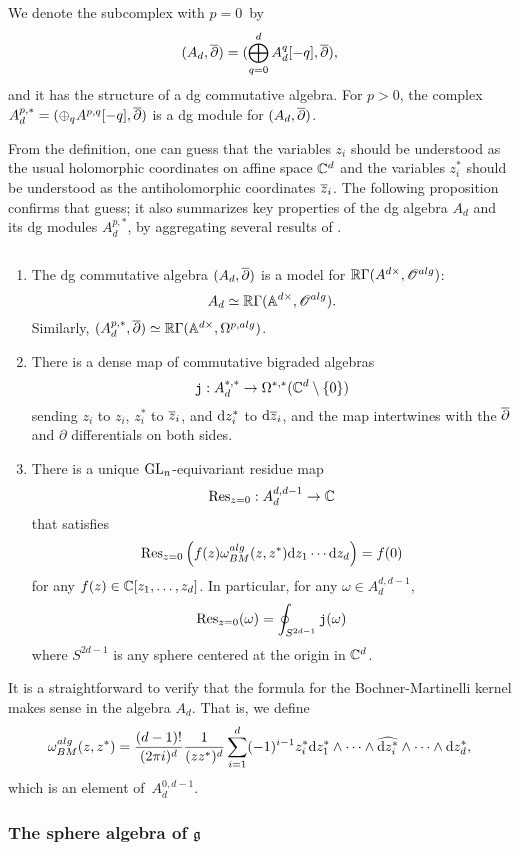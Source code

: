 We denote the subcomplex with $p=0$~by 
\[
(A_d, \dbar) = (\bigoplus_{q = 0}^d A_d^{q}[-q], \dbar),
\] 
and it has the structure of a dg commutative algebra.
For $p>0$, the complex $A^{p,*}_d = (\oplus_q A^{p,q}[-q], \dbar)$ is a dg module for $(A_d, \dbar)$.

From the definition, one can guess that the variables $z_i$ should be understood as the usual holomorphic coordinates on affine space $\CC^d$ and the variables $z^*_i$ should be understood as the antiholomorphic coordinates $\zbar_i$.
The following proposition confirms that guess;
it also summarizes key properties of the dg algebra $A_d$ and its dg modules $A_{d}^{p,*}$,
by aggregating several results of \cite{FHK}.

\begin{prop}
\label{prop: Ad} $\;$
\begin{enumerate}
\item
The dg commutative algebra $(A_d,\dbar)$ is a model for $\RR \Gamma(A^{d\times}, \sO^{alg})$:
\[
A_d \simeq \RR\Gamma(\AA^{d \times}, \sO^{alg}) .
\]
Similarly, $(A_d^{p,*},\dbar) \simeq \RR \Gamma(\AA^{d\times}, \Omega^{p,alg})$.
\item There is a dense map of commutative bigraded algebras
\[
\jou : A^{*,*}_d \to \Omega^{*,*}(\CC^d \setminus \{0\}) 
\]
sending $z_i$ to $z_i$, $z_i^*$ to $\Bar{z}_i$, and $\d z_i^*$ to $\d \zbar_i$, and the map intertwines with the $\dbar$ and $\partial$ differentials on both sides.
\item There is a unique $\GL_n$-equivariant residue map
\[
{\rm Res}_{z=0} : A_d^{d,d-1} \to \CC
\]
that satisfies
\[
\Res_{z=0} \left(f(z) \omega_{BM}^{alg}(z,z^*) \d z_1 \cdots \d z_d\right) = f(0)
\]
for any $f (z) \in \CC[z_1,\ldots,z_d]$. 
In particular, for any $\omega \in A^{d,d-1}_d$,
\[
{\rm Res}_{z=0} (\omega) = \oint_{S^{2d-1}} \jou(\omega)
\]
where $S^{2d-1}$ is any sphere centered at the origin in $\CC^d$. 
\end{enumerate}
\end{prop}

It is a straightforward to verify that the formula for the Bochner-Martinelli kernel makes sense in the algebra $A_d$.
That is, we define
\[
\omega_{BM}^{alg} (z,z^*) = \frac{(d-1)!}{(2 \pi i)^d} \frac{1}{(zz^*)^d} \sum_{i=1}^d (-1)^{i-1} z_i^* \d z_1^* \wedge \cdots \wedge \Hat{\d z_i^*} \wedge \cdots \wedge \d z_d^*,
\]
which is an element of~$A_d^{0,d-1}$. 

\subsubsection{The sphere algebra of $\fg$}

